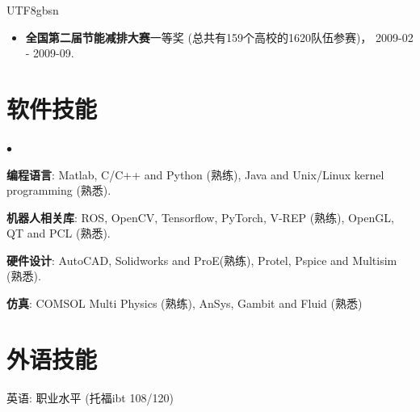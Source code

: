 \documentclass[margin,line]{res}
\newenvironment{list2}{
  \begin{list}{$\bullet$}{%
      \setlength{\itemsep}{0in}
      \setlength{\parsep}{0in} \setlength{\parskip}{0in}
      \setlength{\topsep}{0in} \setlength{\partopsep}{0in} 
      \setlength{\leftmargin}{0.2in}}}{\end{list}}
\begin{document}
\begin{CJK*}{UTF8}{gbsn}
\begin{resume}
\begin{itemize}
\item {\bf 全国第二届节能减排大赛}一等奖 (总共有159个高校的1620队伍参赛)， 2009-02 - 2009-09.


\end{itemize}

\section{\sc 软件技能} 
\begin{list2}
\item {\bf 编程语言}: Matlab, C/C++ and Python (熟练), Java and Unix/Linux kernel programming (熟悉). \\

\item {\bf 机器人相关库}: ROS, OpenCV, Tensorflow, PyTorch, V-REP (熟练), OpenGL, QT and PCL (熟悉).\\

\item {\bf 硬件设计}: AutoCAD, Solidworks and ProE(熟练), Protel, Pspice and Multisim (熟悉).\\

\item {\bf 仿真}: COMSOL Multi Physics (熟练), AnSys, Gambit and Fluid (熟悉) \\
\end{list2}

\section{\sc 外语技能} 
英语: 职业水平 (托福ibt 108/120)\\




%



\end{resume}
\end{CJK*}
\end{document}
